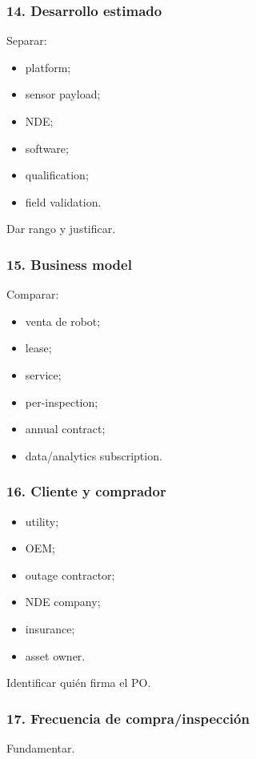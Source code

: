 \documentclass[11pt,a4paper]{article}
\begin{document}
\subsubsection*{14. Desarrollo estimado}
Separar:

\begin{itemize}
\item platform;
\item sensor payload;
\item NDE;
\item software;
\item qualification;
\item field validation.
\end{itemize}

Dar rango y justificar.


\subsubsection*{15. Business model}
Comparar:

\begin{itemize}
\item venta de robot;
\item lease;
\item service;
\item per-inspection;
\item annual contract;
\item data/analytics subscription.
\end{itemize}


\subsubsection*{16. Cliente y comprador}
\begin{itemize}
\item utility;
\item OEM;
\item outage contractor;
\item NDE company;
\item insurance;
\item asset owner.
\end{itemize}

Identificar quién firma el PO.


\subsubsection*{17. Frecuencia de compra/inspección}
Fundamentar.
\end{document}
